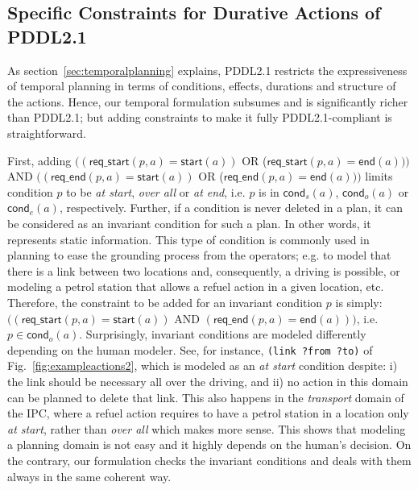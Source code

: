 \documentclass{ecai}
\newcommand{\cond}{\mathsf{cond}}  %
\newcommand{\start}{\mathsf{start}}%
\newcommand{\en}{\mathsf{end}}     %
\newcommand{\tim}{\mathsf{time}}   %
\newcommand{\reqs}{\mathsf{req\_{start}}} %
\newcommand{\reqe}{\mathsf{req\_{end}}}   %
\begin{document}
\begin{table}
\caption{\small Constraints.}
\label{table:constraints}
\end{table}



\subsection{Specific Constraints for Durative Actions of PDDL2.1}
\label{sec:PDDL21constraints}

As section~\ref{sec:temporalplanning} explains, PDDL2.1 restricts the expressiveness of temporal planning in terms of conditions, effects, durations and structure of the actions. Hence, our temporal formulation subsumes and is significantly richer than PDDL2.1; but adding constraints to make it fully PDDL2.1-compliant is straightforward.


First, adding $((\reqs(p,a) = \start(a))$ OR ($\reqs(p,a) = \en(a)))$ AND $((\reqe(p,a) = \start(a))$ OR ($\reqe(p,a) = \en(a)))$ limits condition $p$ to be \emph{at start}, \emph{over all} or \emph{at end}, i.e. $p$ is in $\cond_s(a)$, $\cond_o(a)$ or $\cond_e(a)$, respectively.
Further, if a condition is never deleted in a plan, it can be considered as an invariant condition for such a plan. In other words, it represents static information. This type of condition is commonly used in planning to ease the grounding process from the operators; e.g. to model that there is a link between two locations and, consequently, a driving is possible, or modeling a petrol station that allows a refuel action in a given location, etc. Therefore, the constraint to be added for an invariant condition $p$ is simply: $((\reqs(p,a) = \start(a))$ AND $(\reqe(p,a) = \en(a)))$, i.e. $p \in \cond_o(a)$.
Surprisingly, invariant conditions are modeled differently depending on the human modeler. See, for instance, \texttt{(link ?from ?to)} of Fig.~\ref{fig:exampleactions2}, which is modeled as an \emph{at start} condition despite: i) the link should be necessary all over the driving, and ii) no action in this domain can be planned to delete that link.
This also happens in the \emph{transport} domain of the IPC, where a refuel action requires to have a petrol station in a location only \emph{at start}, rather than \emph{over all} which makes more sense. This shows that modeling a planning domain is not easy and it highly depends on the human's decision. On the contrary, our formulation checks the invariant conditions and deals with them always in the same coherent way.
\end{document}
